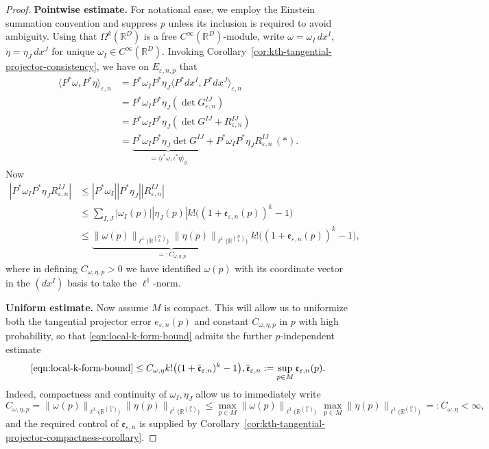 \documentclass{article}
\theoremstyle{remark}
\theoremstyle{plain}
\begin{document}
\begin{proof}
\textbf{Pointwise estimate.} For notational ease, we employ the Einstein summation convention and suppress $p$ unless its inclusion is required to avoid ambiguity. Using that $\Omega^{k}(\mathbb{R}^{D})$ is a free $C^{\infty}(\mathbb{R}^{D})$-module, write $\omega=\omega_{I} \, dx^{I}$, $\eta=\eta_{J}\,dx^{J}$ for unique $\omega_{I} \in C^{\infty}(\mathbb{R}^{D})$. Invoking Corollary~\ref{cor:kth-tangential-projector-consistency}, we have on $E_{\varepsilon, n, p}$ that \begin{align}
\langle P^{*} \omega, P^{*}\eta \rangle_{\varepsilon, n} &= P^{*}\omega_{I}P^{*}\eta_{J} \langle P^{*} dx^{I}, P^{*}dx^{J} \rangle_{\varepsilon, n}  \\
&=  P^{*}\omega_{I}  P^{*}\eta_{J} (\det   {G} _{\varepsilon, n}^{IJ}) \\
&= P^{*}\omega_{I} P^{*}\eta_{J} (\det G^{IJ}+R_{\varepsilon, n}^{IJ}) \\
&= \underbrace{ P^{*}\omega_{I} P^{*}\eta_{J} \det G^{IJ}  }_{ =\langle \iota^{*} \omega, \iota^{*} \eta \rangle_{g}  }+ P^{*} \omega_{I} P^{*} \eta_{J} R_{\varepsilon, n}^{IJ}  \, (*).
\end{align}
Now \begin{align}
|P^{*}\omega_{I} P^{*}\eta_{J} R_{\varepsilon,n}^{IJ}| &\leq |P^{*}\omega_{I}||P^{*}\eta_{J}||R_{\varepsilon, n}^{IJ}| \\
& \leq \sum_{I, J } |\omega_{I}(p)| |\eta_{J}(p)|  k! \big( (1 + \mathfrak{e}_{\varepsilon,n}(p))^{k}-1 \big) \\
& \leq \underbrace{ \|\omega(p)\|_{\ell^{1}\big(\mathbb{R}^{{D \choose k}}\big)} \|\eta(p)\|_{\ell^{1}\big(\mathbb{R}^{{D \choose k}}\big)}  }_{ =: C_{\omega, \eta,p} }  k! \big( (1 + \mathfrak{e}_{\varepsilon,n}(p))^{k}-1 \big) ,\label{eqn:local-k-form-bound}
\end{align}
where in defining \( C_{\omega, \eta, p} >0\) we have identified \( \omega(p) \) with its coordinate vector in the \( (dx^I) \) basis to take the \( \ell^1 \)-norm.


\textbf{Uniform estimate.} Now assume \( M \) is compact. This will allow us to uniformize both the tangential projector error \( e_{\varepsilon, n}(p) \) and constant \( C_{\omega, \eta, p} \) in \( p \) with high probability, so that \eqref{eqn:local-k-form-bound} admits the further \( p \)-independent estimate \[
\eqref{eqn:local-k-form-bound} \leq C_{\omega, \eta} k! \big( (1 + \overline{\mathfrak{e}}_{\varepsilon, n} )^{k}-1  \big), \overline{\mathfrak{e}}_{\varepsilon, n}:= \sup_{p \in M}\mathfrak{e}_{\varepsilon, n}(p).
\]
Indeed, compactness and continuity of \( \omega_{I}, \eta_{J} \) allow us to immediately write \[
C_{\omega, \eta,p}=\|\omega_{}(p)\|_{\ell^{1}\big(\mathbb{R}^{{D \choose k}}\big)} \|\eta_{}(p)\|_{\ell^{1}\big(\mathbb{R}^{{D \choose k}}\big)}\leq \max_{p \in M} \|\omega(p)\|_{\ell^{1}\big(\mathbb{R}^{{D \choose k}}\big)}\, \max_{p \in M} \|\eta(p)\|_{\ell^{1}\big(\mathbb{R}^{{D \choose k}}\big)}=:C_{\omega, \eta}<\infty,
\]
and the required control of \( \mathfrak{e}_{\varepsilon, n} \) is supplied by Corollary~\ref{cor:kth-tangential-projector-compactness-corollary}.






\end{proof}
\end{document}
